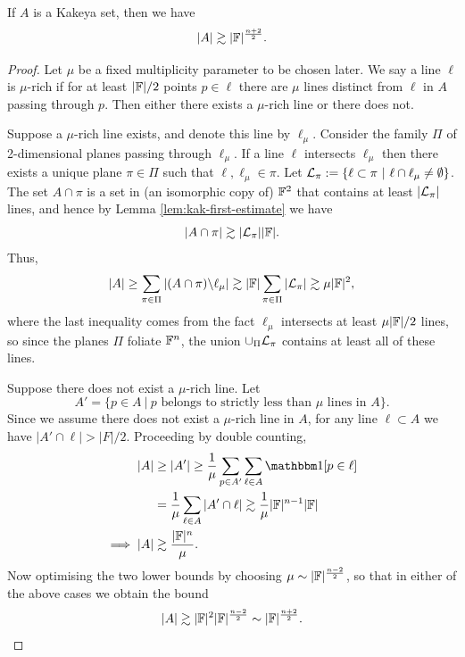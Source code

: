 \begin{theorem}
    If $A$ is a Kakeya set, then we have
    \[
        |A| \gtrsim |\mathbb F|^{\frac{n+2}{2}}.
    \]
\end{theorem}
\begin{proof}
Let $\mu$ be a fixed multiplicity parameter to be chosen later. We say a line $\ell$ is $\mu$-rich if for at least $|\mathbb F|/2$ points $p\in \ell$ there are $\mu$ lines distinct from $\ell$
in $A$ passing through $p$. Then either there exists a $\mu$-rich line or there does not. 

Suppose a $\mu$-rich line exists, and denote this line by $\ell_\mu$. Consider the family $\Pi$ of 2-dimensional planes passing through $\ell_\mu$. 
If a line $\ell$ intersects $\ell_\mu$ then there exists a unique plane $\pi \in \Pi$ such that $\ell, \ell_\mu \in \pi$. 
Let $\mathcal L_\pi := \{\ell \subset \pi \ | \ \ell \cap \ell_\mu \neq \emptyset \}$. The set $A \cap \pi$ is a set in (an isomorphic copy of) $\mathbb F^2$ that contains at least $|\mathcal L_\pi|$
lines, and hence by Lemma \ref{lem:kak-first-estimate} we have
\[
|A \cap \pi| \gtrsim |\mathcal L_\pi| |\mathbb F|.
\]
Thus,
\[
    |A| \geq \sum_{\pi \in \Pi} |(A \cap \pi) \backslash \ell_\mu| \gtrsim |\mathbb F| \sum_{\pi \in \Pi} |\mathcal L_\pi| \gtrsim \mu |\mathbb F|^2,
\]
where the last inequality comes from the fact $\ell_\mu$ intersects at least $\mu |\mathbb F|/2$ lines, so since the planes $\Pi$ foliate $\mathbb F^n$, the union $\cup_\Pi \mathcal L_\pi$ contains at least all of these lines. 

Suppose there does not exist a $\mu$-rich line. Let 
\[
    A' = \{p \in A \ | \ p \text{ belongs to strictly less than } \mu \text{ lines in }A \}.
\]
Since we assume there does not exist a $\mu$-rich line in $A$, for any line $\ell \subset A$ we have $|A' \cap \ell| > |F|/2$. 
Proceeding by double counting, 
\begin{align*}
    |A| &\geq |A'|\geq \frac{1}{\mu} \sum_{p \in A'} \sum_{\ell \in A} \OO[p \in \ell] \\
    &= \frac{1}{\mu} \sum_{\ell \in A} |A' \cap \ell| \gtrsim \frac{1}{\mu} |\FF|^{n-1}|\FF|\\
    \implies |A| &\gtrsim \frac{|\FF|^n}{\mu}.
\end{align*}
Now optimising the two lower bounds by choosing $\mu \sim |\mathbb F|^{\frac{n-2}{2}}$, so that in either of the above cases we obtain the bound
\[
    |A| \gtrsim |\mathbb F|^2|\mathbb F|^{\frac{n-2}{2}} \sim |\mathbb F|^{\frac{n+2}{2}}.
\]
\end{proof}

